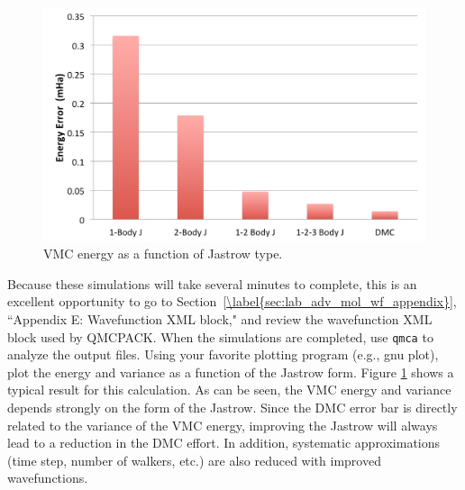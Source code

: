 \begin{figure}
\begin{center}
\includegraphics[trim = 0mm 0mm 0mm 0mm, clip,width=0.75\columnwidth]{./figures/lab_advanced_molecules_vmc_jastrow.png}
\end{center}
\caption{VMC energy as a function of Jastrow type.}
\label{fig:lam_vmc_jastrow}
\end{figure}

Because these simulations will take several minutes to complete, this is an excellent opportunity
to go to Section~\ref{\label{sec:lab_adv_mol_wf_appendix}}, ``Appendix E: Wavefunction XML block," and review the wavefunction XML block used by QMCPACK. When the
simulations are completed, use \texttt{qmca} to analyze the output files. Using your favorite plotting
program (e.g., gnu plot), plot the energy and variance as a function of the Jastrow form.
Figure \ref{fig:lam_vmc_jastrow} shows a typical result for this calculation. As can be seen, the VMC energy and
variance depends strongly on the form of the Jastrow. Since the DMC error bar is directly
related to the variance of the VMC energy, improving the Jastrow will always lead to a
reduction in the DMC effort. In addition, systematic approximations (time step, number of
walkers, etc.) are also reduced with improved wavefunctions.


